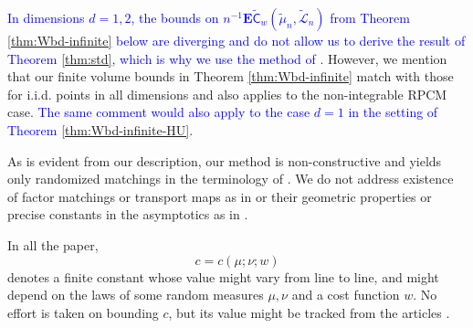 \documentclass[12pt]{article}
\newcommand{\tLeb}{\tilde{\mathcal{L}}}
\newcommand{\1}{\mathbf{1}}
\newcommand{\RL}[1]{\textcolor{blue}{#1}}
\newcommand{\dy}[1]{\textcolor{blue}{#1}}
\newcommand{\RL}[1]{#1}%
\newcommand{\dy}[1]{#1}%
\begin{document}
{{{\RL{In dimensions $ d = 1,2$, the bounds on $n^{-1}\mathbf{E} \widetilde{\mathsf C } _{w}(\tilde \mu _{n},\tLeb_{n})$ from Theorem  \ref{thm:Wbd-infinite} below are diverging and do not allow us to derive the result of Theorem \ref{thm:std}, which is why we use the method of \cite{holroyd2009poisson}.}
   However, we mention that our finite volume bounds in Theorem \ref{thm:Wbd-infinite} match with those for i.i.d. points in all dimensions and also applies to the non-integrable RPCM case. \dy{The same comment would also apply to the case $d = 1$ in the setting of Theorem \ref{thm:Wbd-infinite-HU}.}

As is evident from our description, our method is non-constructive and yields only randomized matchings in the terminology of  \cite{hoffman2006stable}. We do not address existence of factor matchings or transport maps as in \cite{hoffman2006stable,chatterjee2010gravitational,
nazarov2007transportation,huesmann2024transportation} or their geometric properties or precise constants in the asymptotics as in \cite{ambrosio2019pde}.

In all the paper, $$  c = c(\mu ;\nu ;w)$$ denotes a finite constant whose value might vary from line to line, and might depend on the laws of some random measures $ \mu ,\nu $ and a cost function $ w.$ No effort is taken on bounding $ c$, but its value might be tracked from the articles  {\cite{bobkov2020transport,bobkov2021simple}}.

}}}
\end{document}

